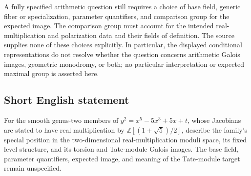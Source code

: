 \documentclass[11pt]{article}
\begin{document}
A fully specified arithmetic question still requires a choice of base field, generic fiber or specialization, parameter quantifiers, and comparison group for the expected image. The comparison group must account for the intended real-multiplication and polarization data and their fields of definition. The source supplies none of these choices explicitly. In particular, the displayed conditional representations do not resolve whether the question concerns arithmetic Galois images, geometric monodromy, or both; no particular interpretation or expected maximal group is asserted here.
\subsection{Short English statement}
For the smooth genus-two members of \(y^2=x^5-5x^3+5x+t\), whose Jacobians are stated to have real multiplication by \(\mathbb Z[(1+\sqrt5)/2]\), describe the family's special position in the two-dimensional real-multiplication moduli space, its fixed level structure, and its torsion and Tate-module Galois images. The base field, parameter quantifiers, expected image, and meaning of the Tate-module target remain unspecified.
\end{document}

